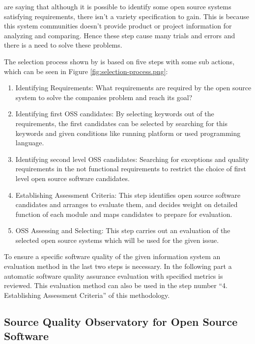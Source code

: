 \documentclass[DIV=calc,paper=a4,fontsize=9pt,twocolumn]{scrartcl}
\begin{document}
\citet{lee2007study} are saying that although it is possible to identify some open source systems satisfying requirements, there isn't a variety specification to gain. This is because this system communities doesn't provide product or project information for analyzing and comparing. Hence these step cause many trials and errors and there is a need to solve these problems.


The selection process shown by \citet{lee2007study} is based on five steps with some sub actions, which can be seen in Figure \ref{fig:selection-process.png}:

\begin{enumerate}
    \item Identifying Requirements: What requirements are required by the open source system to solve the companies problem and reach its goal?
    \item Identifying first OSS candidates: By selecting keywords out of the requirements, the first candidates can be selected by searching for this keywords and given conditions like running platform or used programming language.
    \item Identifying second level OSS candidates: Searching for exceptions and quality requirements in the not functional requirements to restrict the choice of first level open source software candidates.
    \item Establishing Assessment Criteria: This step identifies open source software candidates and arranges to evaluate them, and decides weight on detailed function of each module and maps candidates to prepare for evaluation.
    \item OSS Assessing and Selecting: This step carries out an evaluation of the selected open source systems which will be used for the given issue. 
\end{enumerate}

To ensure a specific software quality of the given information system an evaluation method in the last two steps is necessary. In the following part a automatic software quality assurance evaluation with specified metrics is reviewed. This evaluation method can also be used in the step number \enquote{4. Establishing Assessment Criteria} of this methodology.

\subsection{Source Quality Observatory for Open Source Software}\label{sec:sqsoss}
\end{document}
